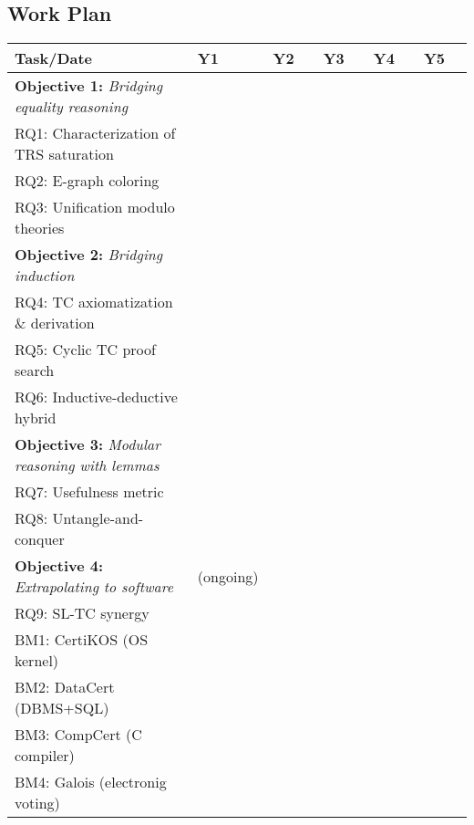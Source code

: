\subsection*{Work Plan}

\newcommand\yrsz{5mm}
\newcommand\doh{\cellcolor{blue!25!white}}
\newcommand\dog{\cellcolor{gray!25!white}}

\begin{tabular}
{|l|p{\yrsz}p{\yrsz}|p{\yrsz}p{\yrsz}|p{\yrsz}p{\yrsz}|p{\yrsz}p{\yrsz}|p{\yrsz}p{\yrsz}|}
\hline
Task/Date & Y1 & & Y2 & & Y3 & & Y4 & & Y5 & \\ \hline
\textbf{Objective 1:} \textit{Bridging equality reasoning} & & & & & & & & & & \\
RQ1: Characterization of TRS saturation & \doh & \doh & \doh & & & & & & & \\
RQ2: E-graph coloring & & & \doh & \doh &&&&&& \\
RQ3: Unification modulo theories & & & & \doh & \doh & \doh &&&& \\ \hline
\textbf{Objective 2:} \textit{Bridging induction} &&&&&&&&&& \\
RQ4: TC axiomatization \& derivation & \doh & \doh &&&&&&&& \\
RQ5: Cyclic TC proof search & & \doh & \doh & \doh &&&&&& \\
RQ6: Inductive-deductive hybrid & & & & \doh & \doh & \doh &&&& \\ \hline
\textbf{Objective 3:} \textit{Modular reasoning with lemmas} & & & & & & & & & & \\
RQ7: Usefulness metric & & & & & & \doh & \doh & & & \\
RQ8: Untangle-and-conquer  & & & & & & & \doh & \doh & \doh & \\ \hline
\textbf{Objective 4:} \textit{Extrapolating to software}  & \multicolumn{2}{c|}{\color{gray}\small (ongoing)} & \dog & \dog & \dog & \dog & \dog & \dog & \dog & \dog \\
RQ9: SL-TC synergy & & & \doh & \doh &&&&&& \\
BM1: CertiKOS (OS kernel) & & & & & \doh & \doh &&&& \\
BM2: DataCert (DBMS+SQL) & & & & & & \doh & \doh &&& \\
BM3: CompCert (C compiler) & & & & & & & \doh & \doh & \doh &  \\
BM4: Galois (electronig voting) & & & & & & &  & & \doh & \doh  \\
\hline
\end{tabular}

